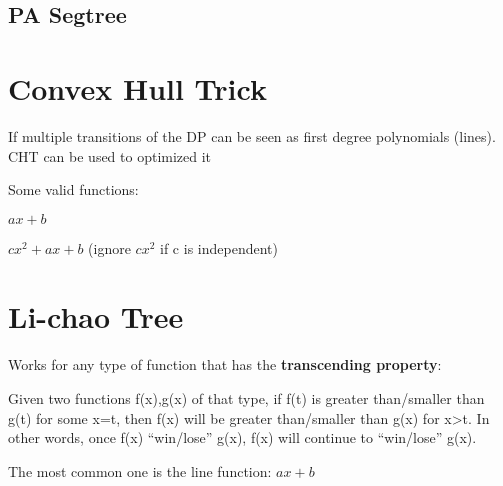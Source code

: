 
    \subsection{PA Segtree}

    
\section{Convex Hull Trick}

    If multiple transitions of the DP can be seen as 
    first degree polynomials (lines). CHT can be used to optimized it

    Some valid functions:

    $ax + b$
    
    $cx^2 + ax + b$ 
    (ignore $cx^2$ if c is independent)


\section{Li-chao Tree}

    Works for any type of function that has the \textbf{transcending property}:

    Given two functions f(x),g(x) of that type, 
    if f(t) is greater than/smaller than g(t) for some x=t,
    then f(x) will be greater than/smaller than g(x) for x>t.
    In other words, once f(x) “win/lose” g(x), f(x) will continue to “win/lose” g(x).

    The most common one is the line function: $ ax + b $
    
